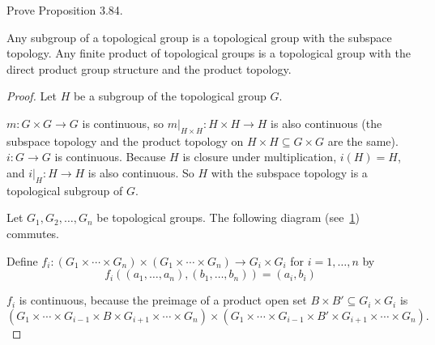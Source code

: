 \begin{exercise}{3.85}
    Prove Proposition 3.84.

    Any subgroup of a topological group is a topological group with the subspace topology. Any finite product of topological groups is a topological group with the direct product group structure and the product topology.
\end{exercise}

\begin{proof}
    Let $H$ be a subgroup of the topological group $G$.

    $m: G\times G\to G$ is continuous, so $m\vert_{H\times H}: H\times H\to H$ is also continuous (the subspace topology and the product topology on $H\times H\subseteq G\times G$ are the same). $i: G\to G$ is continuous. Because $H$ is closure under multiplication, $i(H) = H$, and $i\vert_{H}: H\to H$ is also continuous. So $H$ with the subspace topology is a topological subgroup of $G$.

    Let $G_{1}, G_{2}, \ldots, G_{n}$ be topological groups. The following diagram (see~\ref{fig:3.85}) commutes.
    \begin{figure}[htp]
        \renewcommand{\thefigure}{3.85}
        \centering
        \caption{}\label{fig:3.85}
    \end{figure}

    Define $f_{i}: (G_{1}\times\cdots\times G_{n})\times (G_{1}\times\cdots\times G_{n})\to G_{i}\times G_{i}$ for $i = 1, \ldots, n$ by
    \[
        f_{i}((a_{1}, \ldots, a_{n}), (b_{1}, \ldots, b_{n})) = (a_{i}, b_{i})
    \]

    $f_{i}$ is continuous, because the preimage of a product open set $B\times B'\subseteq G_{i}\times G_{i}$ is
    \[
        (G_{1}\times\cdots\times G_{i-1}\times B\times G_{i+1}\times\cdots\times G_{n})\times (G_{1}\times\cdots\times G_{i-1}\times B'\times G_{i+1}\times\cdots\times G_{n}).
    \]


\end{proof}
